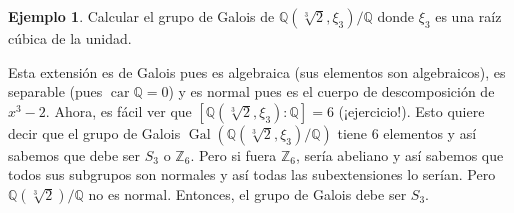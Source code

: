 \documentclass[12pt]{book}
\theoremstyle{definition}
\newtheorem{ex}[teo]{Ejemplo}
\newcommand{\ZZ}{\mathbb{Z}}      %
\newcommand{\QQ}{\mathbb{Q}}
\DeclareMathOperator{\car}{car}
\DeclareMathOperator{\Gal}{Gal}
\begin{document}
\begin{ex}
Calcular el grupo de Galois de $\QQ(\sqrt[3]{2},\xi_3)/\QQ$ donde $\xi_3$ es una raíz cúbica de la unidad.

Esta extensión es de Galois pues es algebraica (sus elementos son algebraicos), es separable (pues $\car \QQ=0$) y es normal pues es el cuerpo de descomposición de $x^3 - 2$. Ahora, es fácil ver que $[\QQ(\sqrt[3]{2},\xi_3):\QQ]=6$ (¡ejercicio!). Esto quiere decir que el grupo de Galois $\Gal(\QQ(\sqrt[3]{2},\xi_3)/\QQ)$ tiene $6$ elementos y así sabemos que debe ser $S_3$ o $\ZZ_6$. Pero si fuera $\ZZ_6$, sería abeliano y así sabemos que todos sus subgrupos son normales y así todas las subextensiones lo serían. Pero $\QQ(\sqrt[3]{2})/\QQ$ no es normal. Entonces, el grupo de Galois debe ser $S_3$.
\end{ex}
\end{document}
